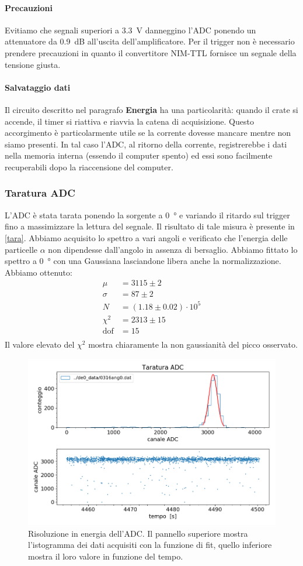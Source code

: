 \paragraph{Precauzioni}
Evitiamo che segnali superiori a \SI{3.3}{V} danneggino l'ADC ponendo un attenuatore da \SI{0.9}{dB} all'uscita dell'amplificatore. Per il trigger non è necessario prendere precauzioni in quanto il convertitore NIM-TTL fornisce un segnale della tensione giusta. 

\paragraph{Salvataggio dati}
Il circuito descritto nel paragrafo \textbf{Energia} ha una particolarità: quando il crate si accende, il timer si riattiva e riavvia la catena di acquisizione.
Questo accorgimento è particolarmente utile se la corrente dovesse mancare mentre non siamo presenti. In tal caso l'ADC, al ritorno della corrente, registrerebbe i dati nella memoria interna (essendo il computer spento) ed essi sono facilmente recuperabili dopo la riaccensione del computer.


\subsubsection{Taratura ADC}
L'ADC è stata tarata ponendo la sorgente a \SI{0}{\degree} e variando il ritardo sul trigger fino a massimizzare la lettura del segnale. Il risultato di tale misura è presente in \autoref{tara}. Abbiamo acquisito lo spettro a vari angoli e verificato che l'energia delle particelle $\alpha$ non dipendesse dall'angolo in assenza di bersaglio. 
Abbiamo fittato lo spettro a \SI{0}{\degree} con una Gaussiana lasciandone libera anche la normalizzazione.\\
Abbiamo ottenuto:
\begin{align*}
\mu &=3115\pm2 \\
\sigma &= 87\pm2 \\
N &=(1.18\pm0.02)\cdot10^5 \\
\chi^2 &=2313\pm15 \\
\text{dof} &=15 \\
\end{align*}
Il valore elevato del $\chi^2$ mostra chiaramente la non gaussianità del picco osservato.

\begin{figure}[h]
\centering
\includegraphics[width=23 em]{immagini/cal_provv}
\caption{Risoluzione in energia dell'ADC. Il pannello superiore mostra l'istogramma dei dati acquisiti con la funzione di fit, quello inferiore mostra il loro valore in funzione del tempo.}
\label{tara}
\end{figure}